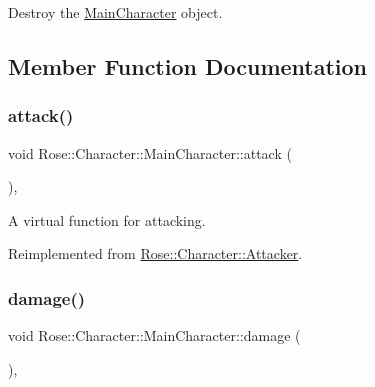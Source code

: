 Destroy the \mbox{\hyperlink{classRose_1_1Character_1_1MainCharacter}{Main\+Character}} object. 



\subsection{Member Function Documentation}
\mbox{\label{classRose_1_1Character_1_1MainCharacter_aec29206b632fb2bfe77af3e9f48835b4}} 
\subsubsection{\texorpdfstring{attack()}{attack()}}
{\footnotesize\ttfamily void Rose\+::\+Character\+::\+Main\+Character\+::attack (\begin{DoxyParamCaption}{ }\end{DoxyParamCaption})\hspace{0.3cm}{\ttfamily [override]}, {\ttfamily [virtual]}}



A virtual function for attacking. 



Reimplemented from \mbox{\hyperlink{classRose_1_1Character_1_1Attacker_a49ee8dfa04018f90c7fd5fa20ba4fcad}{Rose\+::\+Character\+::\+Attacker}}.

\mbox{\label{classRose_1_1Character_1_1MainCharacter_a95fd982ce2de2f75067e68fc4ec49fdc}} 
\subsubsection{\texorpdfstring{damage()}{damage()}}
{\footnotesize\ttfamily void Rose\+::\+Character\+::\+Main\+Character\+::damage (\begin{DoxyParamCaption}{ }\end{DoxyParamCaption})\hspace{0.3cm}{\ttfamily [override]}, {\ttfamily [virtual]}}



